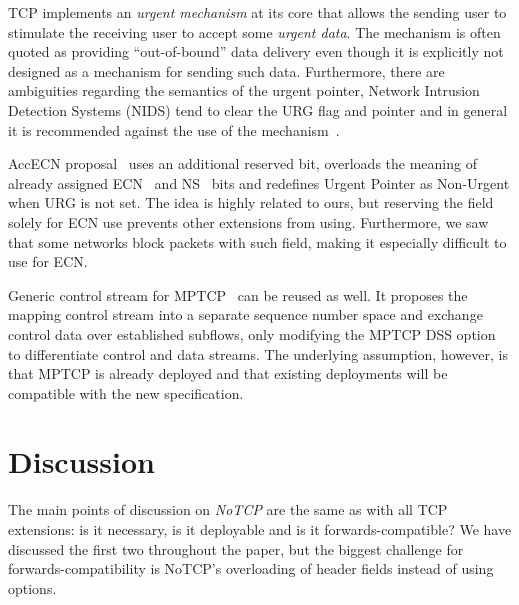 \documentclass{sig-alternate-10pt}
\begin{document}
TCP implements an \emph{urgent mechanism} at its core that allows the sending user to stimulate the receiving user to accept some \emph{urgent data}. The mechanism is often quoted as providing ``out-of-bound'' data delivery even though it is explicitly not designed as a mechanism for sending such data. Furthermore, there are ambiguities regarding the semantics of the urgent pointer, Network Intrusion Detection Systems (NIDS) tend to clear the URG flag and pointer and in general it is recommended against the use of the mechanism~\cite{Gont:2011vi}.

AccECN proposal~\cite{Kuhlewind:2014vd} uses an additional reserved bit, overloads the meaning of already assigned ECN~\cite{Floyd:up} and NS~\cite{Ely:uc} bits and redefines Urgent Pointer as Non-Urgent when URG is not set. The idea is highly related to ours, but reserving the field solely for ECN use prevents other extensions from using. Furthermore, we saw that some networks block packets with such field, making it especially difficult to use for ECN.

Generic control stream for MPTCP~\cite{Bonaventure:wx} can be reused as well. It proposes the mapping control stream into a separate sequence number space and exchange control data over established subflows, only modifying the MPTCP DSS option to differentiate control and data streams. The underlying assumption, however, is that MPTCP is already deployed and that existing deployments will be compatible with the new specification.


\section{Discussion}

The main points of discussion on \emph{NoTCP} are the same as with all TCP extensions: is it necessary, is it deployable and is it forwards-compatible? We have discussed the first two throughout the paper, but the biggest challenge for forwards-compatibility is NoTCP's overloading of header fields instead of using options.
\end{document}
